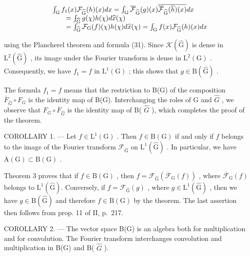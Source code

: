 \[
\begin{array}{r l} & {\int_ {\mathrm{G}} f _ {1} (x) \mathcal {F} _ {\widehat {\mathrm{G}}} (h) (x) d x = \int_ {\mathrm{G}} \overline {{\mathcal {F}}} _ {\widehat {\mathrm{G}}} (g) (x) \overline {{\overline {{\mathcal {F}}} _ {\widehat {\mathrm{G}}} (\overline {{h}}) (x)}} d x} \\ & {\qquad = \int_ {\widehat {\mathrm{G}}} g (\chi) h (\chi) d \widehat {x} (\chi)} \\ & {\qquad = \int_ {\widehat {\mathrm{G}}} \mathcal {F} _ {\mathrm{G}} (f) (\chi) h (\chi) d \widehat {x} (\chi) = \int_ {\mathrm{G}} f (x) \mathcal {F} _ {\widehat {\mathrm{G}}} (h) (x) d x} \end{array}
\]

using the Plancherel theorem and formula (31). Since \(\mathcal{K}(\widehat{\mathrm{G}})\) is dense in \(\mathrm{L}^2 (\widehat{\mathrm{G}})\) , its image under the Fourier transform is dense in \(\mathrm{L}^2 (\mathrm{G})\) . Consequently, we have \(f_{1} = f\) in \(\mathrm{L}^{1}(\mathrm{G})\) ; this shows that \(g\in \mathrm{B}(\widehat{\mathrm{G}})\) .

The formula \(f_{1}=f\) means that the restriction to B(G) of the composition \(\overline{F}_{\widehat{G}}\circ F_{G}\) is the identity map of B(G). Interchanging the roles of G and \(\widehat{G}\) , we observe that \(F_{G}\circ\overline{F}_{\widehat{G}}\) is the identity map of B( \(\widehat{G}\) ), which completes the proof of the theorem.

COROLLARY 1. --- Let \(f \in \mathrm{L}^{1}(\mathrm{G})\) . Then \(f \in \mathrm{B}(\mathrm{G})\) if and only if \(f\) belongs to the image of the Fourier transform \(\mathcal{F}_{\widehat{\mathrm{G}}}\) on \(\mathrm{L}^{1}(\widehat{\mathrm{G}})\) . In particular, we have \(\mathrm{A}(\mathrm{G}) \subset \mathrm{B}(\mathrm{G})\) .

Theorem 3 proves that if \(f \in \mathrm{B}(\mathrm{G})\) , then \(f = \mathcal{F}_{\widehat{\mathrm{G}}}(\overline{\mathcal{F}}_{\mathrm{G}}(f))\) , where \(\overline{\mathcal{F}}_{\mathrm{G}}(f)\) belongs to \(\mathrm{L}^1(\widehat{\mathrm{G}})\). Conversely, if \(f = \mathcal{F}_{\widehat{\mathrm{G}}}(g)\) , where \(g \in \mathrm{L}^1(\widehat{\mathrm{G}})\) , then we have \(g \in \mathrm{B}(\widehat{\mathrm{G}})\) and therefore \(f \in \mathrm{B}(\mathrm{G})\) by the theorem. The last assertion then follows from prop. 11 of II, p.~217.

COROLLARY 2. --- The vector space B(G) is an algebra both for multiplication and for convolution. The Fourier transform interchanges convolution and multiplication in B(G) and B( \(\widehat{G}\) ).


